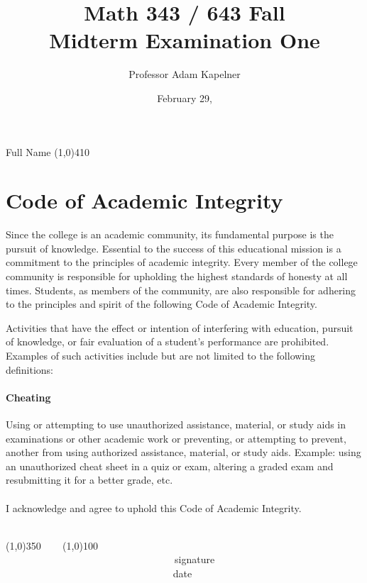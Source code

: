 \documentclass[12pt]{article}
\title{Math 343 / 643 Fall \the\year{} \\ Midterm Examination One \inred{Solutions}}
\author{Professor Adam Kapelner}
\date{February 29, \the\year{}}
\begin{document}
\maketitle

\noindent Full Name \line(1,0){410}

\thispagestyle{empty}

\section*{Code of Academic Integrity}

\footnotesize
Since the college is an academic community, its fundamental purpose is the pursuit of knowledge. Essential to the success of this educational mission is a commitment to the principles of academic integrity. Every member of the college community is responsible for upholding the highest standards of honesty at all times. Students, as members of the community, are also responsible for adhering to the principles and spirit of the following Code of Academic Integrity.

Activities that have the effect or intention of interfering with education, pursuit of knowledge, or fair evaluation of a student's performance are prohibited. Examples of such activities include but are not limited to the following definitions:

\paragraph{Cheating} Using or attempting to use unauthorized assistance, material, or study aids in examinations or other academic work or preventing, or attempting to prevent, another from using authorized assistance, material, or study aids. Example: using an unauthorized cheat sheet in a quiz or exam, altering a graded exam and resubmitting it for a better grade, etc.\\
\\
\noindent I acknowledge and agree to uphold this Code of Academic Integrity. \\~\\

\begin{center}
\line(1,0){350} ~~~ \line(1,0){100}\\
~~~~~~~~~~~~~~~~~~~~~~~~~~~~~~~~~~signature~~~~~~~~~~~~~~~~~~~~~~~~~~~~~~~~~~~~~~~~~~~~~~~~~~~~~~~~~~~~~~ date
\end{center}

\normalsize
\end{document}
